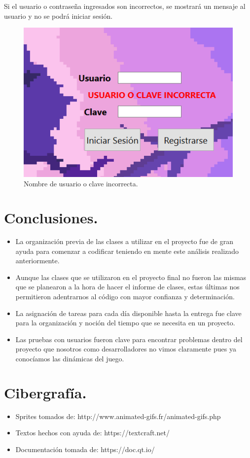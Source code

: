 \documentclass{article}
\begin{document}
\newpage
Si el usuario o contraseña ingresados son incorrectos, se mostrará un mensaje al usuario y no se podrá iniciar sesión.

\begin{figure}[h]
\includegraphics[scale=0.9]{Images/claveinco.png}
\centering
\caption{Nombre de usuario o clave incorrecta.}
\label{fig:claveinco}
\end{figure}




\section{Conclusiones.}
\begin{itemize}
    \item La organización previa de las clases a utilizar en el proyecto fue de gran ayuda para comenzar a codificar teniendo en mente este análisis realizado anteriormente.
    \item Aunque las clases que se utilizaron en el proyecto final no fueron las mismas que se planearon a la hora de hacer el informe de clases, estas últimas nos permitieron adentrarnos al código con mayor confianza y determinación.
    \item La asignación de tareas para cada día disponible hasta la entrega fue clave para la organización y noción del tiempo que se necesita en un proyecto.
    \item Las pruebas con usuarios fueron clave para encontrar problemas dentro del proyecto que nosotros como desarrolladores no vimos claramente pues ya conocíamos las dinámicas del juego.
\end{itemize}

\section{Cibergrafía.}
\begin{itemize}
    \item Sprites tomados de: http://www.animated-gifs.fr/animated-gifs.php
    \item Textos hechos con ayuda de: https://textcraft.net/
    \item Documentación tomada de: https://doc.qt.io/
\end{itemize}
\end{document}
